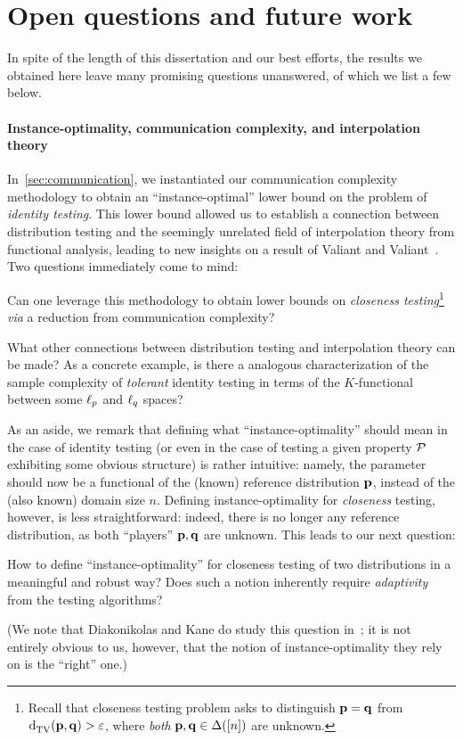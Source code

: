 \section*{Open questions and future work}

In spite of the length of this dissertation and our best efforts, the results we obtained here leave many promising questions unanswered, of which we list a few below.

\paragraph*{Instance-optimality, communication complexity, and interpolation theory}
In~\cref{sec:communication}, we instantiated our communication complexity methodology to obtain an ``instance-optimal'' lower bound on the problem of \emph{identity testing}. This lower bound allowed us to establish a connection between distribution testing and the seemingly unrelated field of interpolation theory from functional analysis, leading to new insights on a result of Valiant and Valiant~\cite{VV:14}. Two questions immediately come to mind:
\begin{question}
  Can one leverage this methodology to obtain lower bounds on \emph{closeness testing}\footnote{Recall that closeness testing problem asks to distinguish $\p=\q$ from $\totalvardist{\p}{\q}>\eps$, where \emph{both} $\p,\q\in\distribs{[n]}$ are unknown.}{} \textit{via} a reduction from communication complexity?
\end{question}
\begin{question}
  What other connections between distribution testing and interpolation theory can be made? As a concrete example, is there a analogous characterization of the sample complexity of \emph{tolerant} identity testing in terms of the $K$-functional between some $\lp[p]$ and $\lp[q]$ spaces?
\end{question}
As an aside, we remark that defining what ``instance-optimality'' should mean  in the case of identity testing (or even in the case of testing a given property $\property$ exhibiting some obvious structure) is rather intuitive: namely, the parameter should now be a functional of the (known) reference distribution $\p$, instead of the (also known) domain size $n$. Defining instance-optimality for \emph{closeness} testing, however, is less straightforward: indeed, there is no longer any reference distribution, as both ``players'' $\p,\q$ are unknown. This leads to our next question:
\begin{question}
  How to define ``instance-optimality'' for closeness testing of two distributions in a meaningful and robust way? Does such a notion inherently require \emph{adaptivity} from the testing algorithms?
\end{question}
\noindent (We note that Diakonikolas and Kane do study this question in~\cite{DK:16}; it is not entirely obvious to us, however, that the notion of instance-optimality they rely on is the ``right'' one.)


